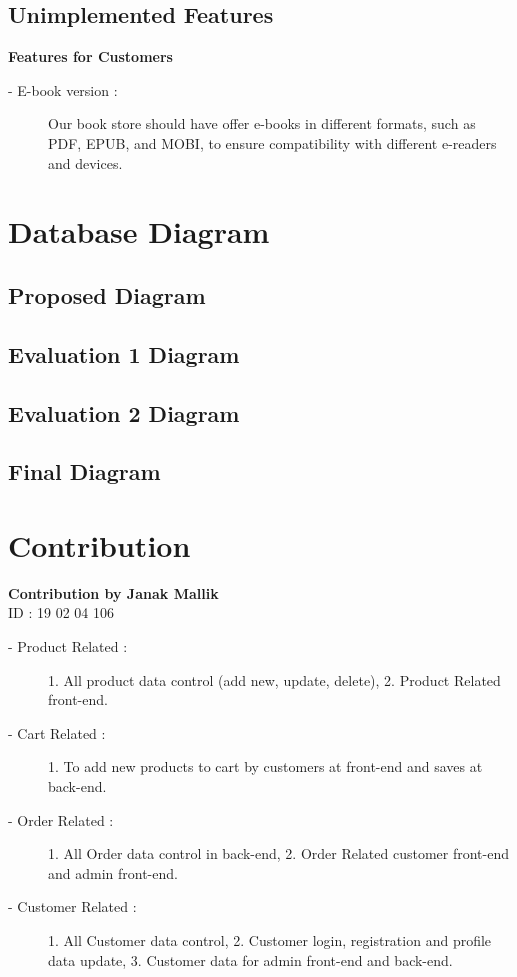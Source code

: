 \documentclass[12pt,a4paper]{article}
\begin{document}
\subsection{Unimplemented Features}
{\large\textbf{Features for Customers}}
\begin{description}
    \item[\hspace{7mm}- E-book version :] Our book store should have offer e-books in different formats, such as PDF, EPUB, and MOBI, to ensure compatibility with different e-readers and devices.
\end{description}
\section{Database Diagram}
\subsection{Proposed Diagram}
\subsection{Evaluation 1 Diagram}
\subsection{Evaluation 2 Diagram}
\subsection{Final Diagram}
\section{Contribution}
{\large\textbf{Contribution by Janak Mallik}}
\\ID : 19 02 04 106
\begin{description}
    \item[\hspace{7mm}- Product Related :] 1. All product data control (add new, update, delete), 2. Product Related front-end.
    \item[\hspace{7mm}- Cart Related :] 1. To add new products to cart by customers at front-end and saves at back-end.
    \item[\hspace{7mm}- Order Related :] 1. All Order data control in back-end, 2. Order Related customer front-end and admin front-end.
    \item[\hspace{7mm}- Customer Related :] 1. All Customer data control, 2. Customer login, registration and profile data update, 3. Customer data for admin front-end and back-end.
\end{description}
\end{document}
